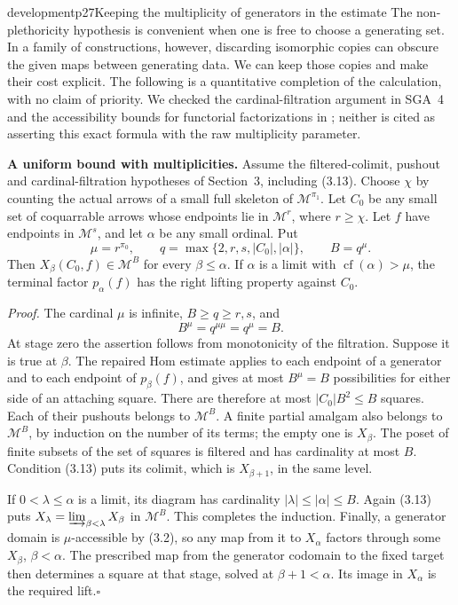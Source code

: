\begin{dcomment}{development}{p27}{Keeping the multiplicity of generators in the estimate}
The non-plethoricity hypothesis is convenient when one is free to choose a generating set. In a family of constructions, however, discarding isomorphic copies can obscure the given maps between generating data. We can keep those copies and make their cost explicit. The following is a quantitative completion of the calculation, with no claim of priority. We checked the cardinal-filtration argument in SGA~4 and the accessibility bounds for functorial factorizations in \citet[Theorem 4.4]{Low2016Heart}; neither is cited as asserting this exact formula with the raw multiplicity parameter.

\textbf{A uniform bound with multiplicities.}\ours
Assume the filtered-colimit, pushout and cardinal-filtration hypotheses of Section~3, including (3.13). Choose $\chi$ by counting the actual arrows of a small full skeleton of $\mathcal M^{\pi_1}$. Let $C_0$ be any small set of coquarrable arrows whose endpoints lie in $\mathcal M^r$, where $r\geq\chi$. Let $f$ have endpoints in $\mathcal M^s$, and let $\alpha$ be any small ordinal. Put
\[
\mu=r^{\pi_0},\qquad
q=\max\{2,r,s,|C_0|,|\alpha|\},\qquad B=q^\mu.
\]
Then $X_\beta(C_0,f)\in\mathcal M^B$ for every $\beta\leq\alpha$. If $\alpha$ is a limit with $\operatorname{cf}(\alpha)>\mu$, the terminal factor $p_\alpha(f)$ has the right lifting property against $C_0$.

\emph{Proof.} The cardinal $\mu$ is infinite, $B\geq q\geq r,s$, and
\[
B^\mu=q^{\mu\mu}=q^\mu=B.
\]
At stage zero the assertion follows from monotonicity of the filtration. Suppose it is true at $\beta$. The repaired Hom estimate applies to each endpoint of a generator and to each endpoint of $p_\beta(f)$, and gives at most $B^\mu=B$ possibilities for either side of an attaching square. There are therefore at most $|C_0|B^2\leq B$ squares. Each of their pushouts belongs to $\mathcal M^B$. A finite partial amalgam also belongs to $\mathcal M^B$, by induction on the number of its terms; the empty one is $X_\beta$. The poset of finite subsets of the set of squares is filtered and has cardinality at most $B$. Condition (3.13) puts its colimit, which is $X_{\beta+1}$, in the same level.

If $0<\lambda\leq\alpha$ is a limit, its diagram has cardinality $|\lambda|\leq|\alpha|\leq B$. Again (3.13) puts $X_\lambda=\varinjlim_{\beta<\lambda}X_\beta$ in $\mathcal M^B$. This completes the induction. Finally, a generator domain is $\mu$-accessible by (3.2), so any map from it to $X_\alpha$ factors through some $X_\beta$, $\beta<\alpha$. The prescribed map from the generator codomain to the fixed target then determines a square at that stage, solved at $\beta+1<\alpha$. Its image in $X_\alpha$ is the required lift.\hfill$\square$


\end{dcomment}
